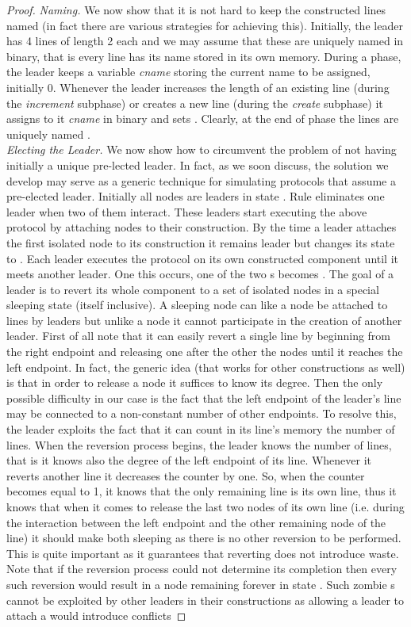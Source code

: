 \documentclass[oribibl, 11pt]{llncs}
\begin{document}
\begin{proof}
\emph{Naming.} We now show that it is not hard to keep the constructed lines named (in fact there are various strategies for achieving this). Initially, the leader has 4 lines of length 2 each and we may assume that these are uniquely named  in binary, that is every line has its name stored in its own memory. During a phase, the leader keeps a variable \emph{cname} storing the current name to be assigned, initially 0. Whenever the leader increases the length of an existing line (during the \emph{increment} subphase) or creates a new line (during the \emph{create} subphase) it assigns to it \emph{cname} in binary and sets . Clearly, at the end of phase  the lines are uniquely named .\\

\vspace{-3pt}
\emph{Electing the Leader.} We now show how to circumvent the problem of not having initially a unique pre-lected leader. In fact, as we soon discuss, the solution we develop may serve as a generic technique for simulating protocols that assume a pre-elected leader. Initially all nodes are leaders in state . Rule  eliminates one leader when two of them interact. These leaders start executing the above protocol by attaching  nodes to their construction. By the time a  leader attaches the first isolated node to its construction it remains leader but changes its state to . Each leader executes the protocol on its own constructed component until it meets another leader. One this occurs, one of the two s becomes . The goal of a  leader is to revert its whole component to a set of isolated nodes in a special sleeping state  (itself inclusive). A sleeping node can like a  node be attached to lines by leaders but unlike a  node it cannot participate in the creation of another leader. First of all note that it can easily revert a single line by beginning from the right endpoint and releasing one after the other the nodes until it reaches the left endpoint. In fact, the generic idea (that works for other constructions as well) is that in order to release a node it suffices to know its degree. Then the only possible difficulty in our case is the fact that the left endpoint of the leader's line may be connected to a non-constant number of other endpoints. To resolve this, the leader exploits the fact that it can count in its line's memory the number of lines. When the reversion process begins, the leader knows the number of lines, that is it knows also the degree of the left endpoint of its line. Whenever it reverts another line it decreases the counter by one. So, when the counter becomes equal to 1, it knows that the only remaining line is its own line, thus it knows that when it comes to release the last two nodes of its own line (i.e. during the interaction between the left endpoint and the other remaining node of the line) it should make both sleeping as there is no other reversion to be performed. This is quite important as it guarantees that reverting does not introduce waste. Note that if the reversion process could not determine its completion then every such reversion would result in a node remaining forever in state . Such zombie s cannot be exploited by other leaders in their constructions as allowing a leader to attach a  would introduce conflicts 
\end{proof}
\end{document}
